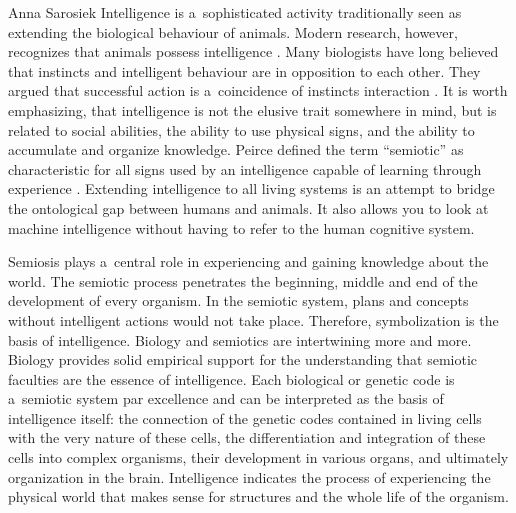 \begin{artengenv}{Anna Sarosiek}
Intelligence is a~sophisticated activity traditionally seen as extending the biological behaviour of animals. Modern research, however, recognizes that animals possess intelligence
\parencites[][]{waal_are_2016}[][]{heinrich_mind_1999}[][]{fischer_animal_2011}. %
 Many biologists have long believed that instincts and intelligent behaviour are in opposition to each other. They argued that successful action is a~coincidence of instincts interaction 
\parencites[][]{richter_animal_1927}[][p.150]{thorndike_animal_2017}. %
 It is worth emphasizing, that intelligence is not the elusive trait somewhere in mind, but is related to social abilities, the ability to use physical signs, and the ability to accumulate and organize knowledge. Peirce defined the term ``semiotic'' as characteristic for all signs used by an intelligence capable of learning through experience 
\parencite[][]{peirce_collected_1994}. %
 Extending intelligence to all living systems is an attempt to bridge the ontological gap between humans and animals. It also allows you to look at machine intelligence without having to refer to the human cognitive system.

Semiosis plays a~central role in experiencing and gaining knowledge about the world. The semiotic process penetrates the beginning, middle and end of the development of every organism. In the semiotic system, plans and concepts without intelligent actions would not take place. Therefore, symbolization is the basis of intelligence. Biology and semiotics are intertwining more and more. Biology provides solid empirical support for the understanding that semiotic faculties are the essence of intelligence. Each biological or genetic code is a~semiotic system par excellence and can be interpreted as the basis of intelligence itself: the connection of the genetic codes contained in living cells with the very nature of these cells, the differentiation and integration of these cells into complex organisms, their development in various organs, and ultimately organization in the brain. Intelligence indicates the process of experiencing the physical world that makes sense for structures and the whole life of the organism.


\end{artengenv}
